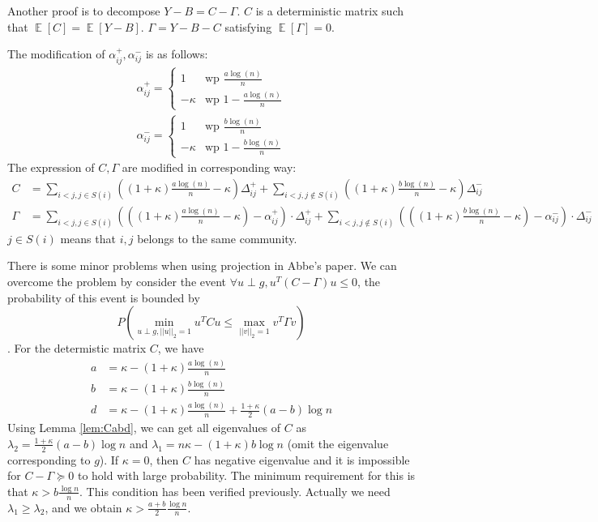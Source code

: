 \documentclass{ctexart}
\DeclareMathOperator{\E}{\mathbb{E}}
\newcommand{\A}{\frac{a \log(n)}{n}}
\newcommand{\B}{\frac{b \log(n)}{n}}
\begin{document}
Another proof is to decompose $Y-B=C-\Gamma$.
$C$ is a deterministic matrix
such that $\E[C]=\E[Y-B]$.
$\Gamma = Y-B-C$ satisfying $\E[\Gamma]=0$.

The modification of $\alpha_{ij}^+, \alpha_{ij}^-$ is as follows:
\begin{align}
\alpha^+_{ij}=\begin{cases} 1 & \text{wp }\A \\ -\kappa & \text{wp } 1-\A \end{cases}\\
\alpha^-_{ij}=\begin{cases} 1 & \text{wp }\B \\ -\kappa & \text{wp } 1-\B \end{cases}
\end{align}
The expression of $C, \Gamma$ are modified in corresponding way:
\begin{align}
C &=  \sum_{i<j, j \in S(i)}\left((1+\kappa)\A-\kappa\right)\Delta^+_{ij}+\sum_{i<j, j \notin S(i)} \left((1+\kappa)\B-\kappa\right) \Delta^-_{ij}\\
\Gamma &=  \sum_{i<j, j \in S(i)}\left(\left((1+\kappa)\A-\kappa\right) - \alpha^{+}_{ij}\right) \cdot \Delta^+_{ij} + \sum_{i<j, j \notin S(i)} \left(\left((1+\kappa)\B-\kappa\right) - \alpha^{-}_{ij}\right) \cdot \Delta^-_{ij}
\end{align}
$j\in S(i)$ means that $i,j$ belongs to the same community.

There is some minor problems when using projection in Abbe's paper. We can overcome the problem by consider
the event $\forall u \perp g, u^T(C-\Gamma)u \leq 0$, the probability of this event is bounded by
$$P(\min_{u \perp g, ||u||_2=1} u^T C u \leq \max_{||v||_2=1} v^T \Gamma v)$$.
For the determistic matrix $C$, we have
\begin{align}
a &= \kappa - (1+\kappa) \A \\
b &= \kappa - (1+\kappa) \B \\
d & = \kappa - (1+\kappa) \A + \frac{1+\kappa}{2} (a-b) \log n
\end{align}
Using Lemma \ref{lem:Cabd}, we can get all eigenvalues of $C$ as $\lambda_2=\frac{1+\kappa}{2}(a-b)\log n $ and $\lambda_1=n\kappa - (1+\kappa)b\log n$
(omit the eigenvalue corresponding to $g$). If $\kappa = 0$, then $C$ has negative eigenvalue and it is impossible for
$C-\Gamma \succeq 0 $ to hold
with large probability. The minimum requirement for this is that $\kappa > b\frac{\log n}{n}$.
This condition has been verified previously. Actually we need $\lambda_1 \geq \lambda_2$, and we obtain
$\kappa > \frac{a+b}{2} \frac{\log n}{n}$.
\end{document}
